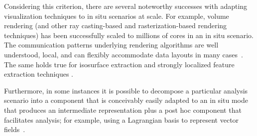 \begin{refsection}
Considering this criterion, there are several noteworthy successes with adapting visualization techniques to in situ scenarios at scale. For example, volume rendering (and other ray casting-based and rasterization-based rendering techniques) has been successfully scaled to millions of cores in an in situ scenario. The communication patterns underlying rendering algorithms are well understood, local, and can flexibly accommodate data layouts in many cases~\cite{Larsen16}. The same holds true for isosurface extraction and strongly localized feature extraction techniques \cite{Weber12}.

Furthermore, in some instances it is possible to decompose a particular analysis scenario into a component that is conceivably easily adapted to an in situ mode that produces an intermediate representation plus a post hoc component that facilitates analysis; for example, using a Lagrangian basis to represent vector fields~\cite{Agranovsky14}.


\end{refsection}
